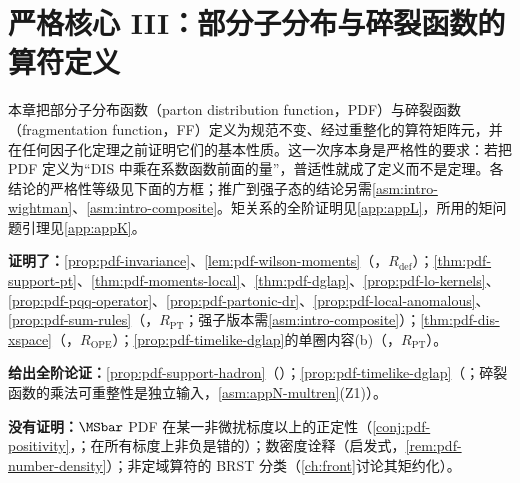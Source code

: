 \chapter{严格核心 III：部分子分布与碎裂函数的算符定义}\label{ch:pdf}

本章把部分子分布函数（parton distribution function，PDF）与碎裂函数（fragmentation function，FF）定义为规范不变、经过重整化的算符矩阵元，并在任何因子化定理之前证明它们的基本性质。这一次序本身是严格性的要求：若把 PDF 定义为“DIS 中乘在系数函数前面的量”，普适性就成了定义而不是定理。各结论的严格性等级见下面的方框；推广到强子态的结论另需\cref{asm:intro-wightman}、\cref{asm:intro-composite}。矩关系的全阶证明见\cref{app:appL}，所用的矩问题引理见\cref{app:appK}。

\begin{tcolorbox}[enhanced,breakable,title=本章证明了什么／没有证明什么,fonttitle=\bfseries,
  colback=gray!3!white,colframe=gray!55!black,boxrule=0.6pt,arc=2pt,
  left=5pt,right=5pt,top=3pt,bottom=3pt,before skip=6pt,after skip=6pt]
\textbf{证明了：}\cref{prop:pdf-invariance}、\cref{lem:pdf-wilson-moments}（\tagR，$R_{\mathrm{def}}$）；\cref{thm:pdf-support-pt}、\cref{thm:pdf-moments-local}、\cref{thm:pdf-dglap}、\cref{prop:pdf-lo-kernels}、\cref{prop:pdf-pqq-operator}、\cref{prop:pdf-partonic-dr}、\cref{prop:pdf-local-anomalous}、\cref{prop:pdf-sum-rules}（\tagR，$R_{\mathrm{PT}}$；强子版本需\cref{asm:intro-composite}）；\cref{thm:pdf-dis-xspace}（\tagR，$R_{\mathrm{OPE}}$）；\cref{prop:pdf-timelike-dglap}的单圈内容(b)（\tagR，$R_{\mathrm{PT}}$）。\par
\textbf{给出全阶论证：}\cref{prop:pdf-support-hadron}（\tagA）；\cref{prop:pdf-timelike-dglap}（\tagA；碎裂函数的乘法可重整性是独立输入，\cref{asm:appN-multren}(Z1)）。\par
\textbf{没有证明：}$\MSbar$ PDF 在某一非微扰标度以上的正定性（\cref{conj:pdf-positivity}，\tagC；在所有标度上非负是错的）；数密度诠释（启发式，\cref{rem:pdf-number-density}）；非定域算符的 BRST 分类（\cref{ch:front}讨论其矩约化）。
\end{tcolorbox}

